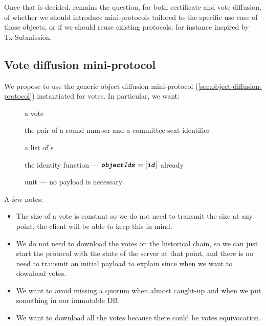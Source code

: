 Once that is decided, remains the question, for both certificate and vote
diffusion, of whether we should introduce mini-protocols tailored to the
specific use case of those objects, or if we should reuse existing protocols,
for instance inspired by Tx-Submission.


\subsection{Vote diffusion mini-protocol}%
\label{sec:vote-diffusion}

We propose to use the generic object diffusion mini-protocol
(\cref{sec:object-diffusion-protocol}) instantiated for votes. In particular,
we want:
%
\begin{description}
\item[] a vote
\item[] the pair of a round number and a committee seat
  identifier
\item[] a list of s
\item[] the identity function --- \(\textbf{\texttt{\textit{objectIds}}} =
  [\textbf{\texttt{\textit{id}}}]\) already
\item[] unit --- no payload is necessary
\end{description}

A few notes:

\begin{itemize}
\item The size of a vote is constant so we do not need to transmit the size at
  any point, the client will be able to keep this in mind.

\item We do not need to download the votes on the historical chain, so we can
  just start the protocol with the state of the server at that point, and there
  is no need to transmit an initial payload to explain since when we want to
  download votes.

\item We want to avoid missing a quorum when almost caught-up and when we put
  something in our immutable DB.

\item We want to download all the votes because there could be votes
  equivocation.
\end{itemize}

